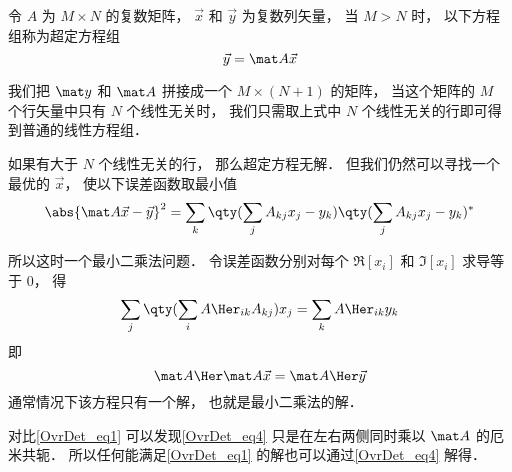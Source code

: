 
令 $A$ 为 $M\times N$ 的复数矩阵， $\vec x$ 和 $\vec y$ 为复数列矢量， 当 $M > N$ 时， 以下方程组称为超定方程组
\begin{equation}\label{OvrDet_eq1}
\vec y = \mat A \vec x
\end{equation}

我们把 $\mat y$ 和 $\mat A$ 拼接成一个 $M\times(N+1)$ 的矩阵， 当这个矩阵的 $M$ 个行矢量中只有 $N$ 个线性无关时， 我们只需取上式中 $N$ 个线性无关的行即可得到普通的线性方程组．

如果有大于 $N$ 个线性无关的行， 那么超定方程无解． 但我们仍然可以寻找一个最优的 $\vec x$， 使以下误差函数取最小值
\begin{equation}
\abs{\mat A\vec x - \vec y}^2 =  \sum_k  \qty(\sum_j A_{kj} x_j - y_k) \qty(\sum_j A_{kj} x_j - y_k)^*
\end{equation}

所以这时一个最小二乘法问题． 令误差函数分别对每个 $\Re[x_i]$ 和 $\Im[x_i]$ 求导等于 0， 得
\begin{equation}
\sum_j \qty(\sum_i A\Her_{ik} A_{kj}) x_j = \sum_k A\Her_{ik} y_k
\end{equation}
即
\begin{equation}\label{OvrDet_eq4}
\mat A\Her \mat A \vec x = \mat A\Her \vec y
\end{equation}
通常情况下该方程只有一个解， 也就是最小二乘法的解．

对比\autoref{OvrDet_eq1} 可以发现\autoref{OvrDet_eq4} 只是在左右两侧同时乘以 $\mat A$ 的厄米共轭． 所以任何能满足\autoref{OvrDet_eq1} 的解也可以通过\autoref{OvrDet_eq4} 解得．
